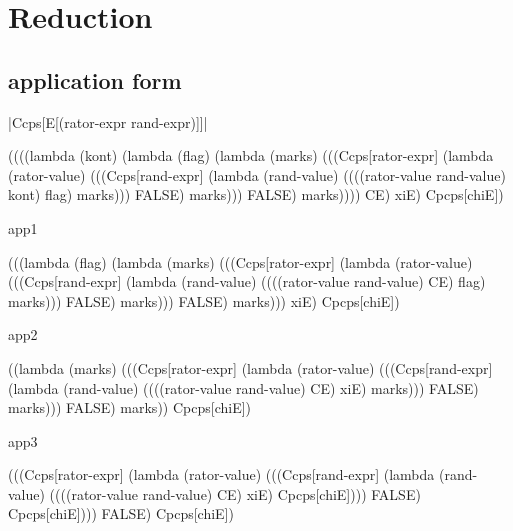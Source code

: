 \chapter{Reduction}

\section{application form}

\noindent
\scheme|Ccps[E[(rator-expr rand-expr)]]|
\begin{schemeblock}
\begin{schemedisplay}
((((lambda (kont)
     (lambda (flag)
       (lambda (marks)
         (((Ccps[rator-expr]
                (lambda (rator-value)
                  (((Ccps[rand-expr]
                         (lambda (rand-value)
                           ((((rator-value rand-value) kont) flag) marks)))
                    FALSE) marks)))
           FALSE) marks))))
   CE) xiE) Cpcps[chiE])
\end{schemedisplay}
\end{schemeblock}

\noindent
app1

\begin{schemeblock}
\begin{schemedisplay}
(((lambda (flag)
    (lambda (marks)
      (((Ccps[rator-expr]
             (lambda (rator-value)
               (((Ccps[rand-expr]
                      (lambda (rand-value)
                        ((((rator-value rand-value) CE) flag) marks)))
                 FALSE) marks)))
        FALSE) marks)))
  xiE) Cpcps[chiE])
\end{schemedisplay}
\end{schemeblock}

\noindent
app2

\begin{schemeblock}
\begin{schemedisplay}
((lambda (marks)
   (((Ccps[rator-expr]
          (lambda (rator-value)
            (((Ccps[rand-expr]
                   (lambda (rand-value)
                     ((((rator-value rand-value) CE) xiE) marks)))
              FALSE) marks)))
     FALSE) marks)) Cpcps[chiE])
\end{schemedisplay}
\end{schemeblock}

\noindent
app3

\begin{schemeblock}
\begin{schemedisplay}
(((Ccps[rator-expr]
       (lambda (rator-value)
         (((Ccps[rand-expr]
                (lambda (rand-value)
                  ((((rator-value rand-value) CE) xiE) Cpcps[chiE])))
           FALSE) Cpcps[chiE])))
  FALSE) Cpcps[chiE])
\end{schemedisplay}
\end{schemeblock}

